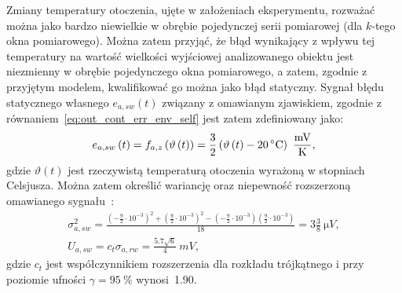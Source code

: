 Zmiany temperatury otoczenia, ujęte w założeniach eksperymentu, rozważać można jako bardzo niewielkie w obrębie pojedynczej serii pomiarowej (dla $k$-tego okna pomiarowego). Można zatem przyjąć, że błąd wynikający z wpływu tej temperatury na wartość wielkości wyjściowej analizowanego obiektu jest niezmienny w obrębie pojedynczego okna pomiarowego, a zatem, zgodnie z przyjętym modelem, kwalifikować go można jako błąd statyczny. Sygnał błędu statycznego własnego $e_{a,sw}(t)$ związany z omawianym zjawiskiem, zgodnie z równaniem~\eqref{eq:out_cont_err_env_self} jest zatem zdefiniowany jako:
\begin{equation}
e_{a,sw} \emb{t} = f_{a,z} \left( \vartheta \emb{t} \right) = \frac{3}{2} \left( \vartheta \emb{t} - \qty{20}{\degreeCelsius} \right)~\unit{\frac{mV}{K}} \label{eq:sym_parta_stat_err},
\end{equation}
gdzie $\vartheta(t)$ jest rzeczywistą temperaturą otoczenia wyrażoną w stopniach Celsjusza. Można zatem określić wariancję oraz niepewność rozszerzoną omawianego sygnału~\cite{jcgm_guide}:
\begin{gather}
\sigma_{a,sw}^{2} = \frac{\left( -\frac{9}{2} \cdot 10^{-3} \right)^{2} + \left( \frac{9}{2} \cdot 10^{-3} \right)^{2} - \left( -\frac{9}{2} \cdot 10^{-3} \right) \left( \frac{9}{2} \cdot 10^{-3} \right)}{18} = 3 \frac{3}{8}~\unit{\micro V} \label{eq:sym_parta_stat_var}, \\
U_{a,sw} = c_{t} \sigma_{a,rw} = \frac{\num{5.7} \sqrt{6}}{4}~\unit{mV} \label{eq:sym_parta_stat_unc},
\end{gather}
gdzie $c_{t}$ jest współczynnikiem rozszerzenia dla rozkładu trójkątnego i przy poziomie ufności $\gamma = \qty{95}{\percent}$ wynosi~\num{1.90}.

